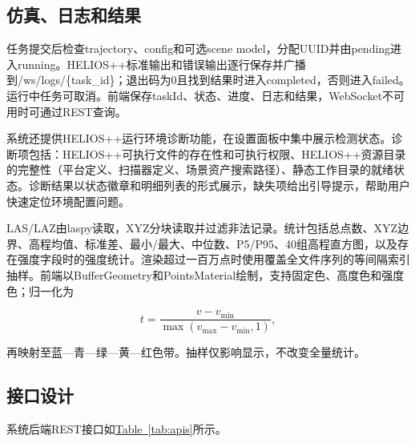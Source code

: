 \documentclass[a4paper,fleqn]{cas-sc}
\newcommand{\refTab}[1]{\hyperref[#1]{Table~\ref*{#1}}}
\begin{document}
\subsection{仿真、日志和结果}

任务提交后检查trajectory、config和可选scene model，分配UUID并由pending进入running。HELIOS++标准输出和错误输出逐行保存并广播到/ws/logs/\{task\_id\}；退出码为0且找到结果时进入completed，否则进入failed。运行中任务可取消。前端保存taskId、状态、进度、日志和结果，WebSocket不可用时可通过REST查询。

系统还提供HELIOS++运行环境诊断功能，在设置面板中集中展示检测状态。诊断项包括：HELIOS++可执行文件的存在性和可执行权限、HELIOS++资源目录的完整性（平台定义、扫描器定义、场景资产搜索路径）、静态工作目录的就绪状态。诊断结果以状态徽章和明细列表的形式展示，缺失项给出引导提示，帮助用户快速定位环境配置问题。

LAS/LAZ由laspy读取\citep{laspy}，XYZ分块读取并过滤非法记录。统计包括总点数、XYZ边界、高程均值、标准差、最小/最大、中位数、P5/P95、40组高程直方图，以及存在强度字段时的强度统计。渲染超过一百万点时使用覆盖全文件序列的等间隔索引抽样。前端以BufferGeometry和PointsMaterial绘制，支持固定色、高度色和强度色；归一化为

\begin{equation}
    t = \frac{v - v_{\min}}{\max(v_{\max} - v_{\min}, 1)},
\end{equation}

再映射至蓝—青—绿—黄—红色带。抽样仅影响显示，不改变全量统计。

\subsection{接口设计}

系统后端REST接口如\refTab{tab:apis}所示。
\end{document}
